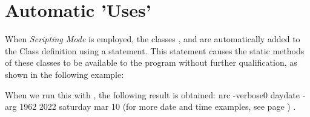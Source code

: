 \section{Automatic 'Uses'}
When \emph{Scripting Mode}  is employed, the classes ,  and  are automatically added to the Class definition using a  statement. This statement causes the static methods of these classes to be available to the program without further qualification, as shown in the following example:

When we run this with , the following result is obtained:
\bash[stdout]
nrc -verbose0 daydate -arg 1962 2022 saturday mar 10
\END
(for more date and time examples, see page \pageref{refdatetimearith}) .
